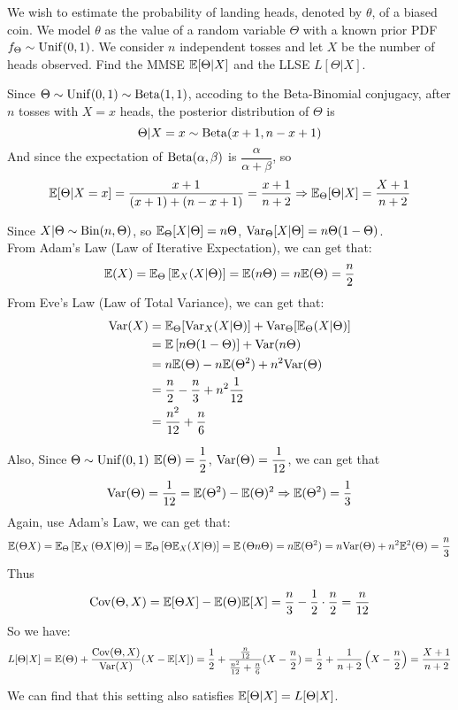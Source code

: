 \begin{homeworkProblem}

We wish to estimate the probability of landing heads, denoted by $\theta$, of a biased coin. We model $\theta$ as the value of a random variable $\Theta$ with a known prior PDF $f_{\Theta} \sim \operatorname{Unif}(0,1)$. We consider $n$ independent tosses and let $X$ be the number of heads observed. Find the MMSE $\mathbb{E}[\Theta | X]$ and the LLSE $L[\Theta | X]$.

\solution
Since $\Theta\sim\operatorname{Unif}(0,1)\sim \operatorname{Beta}(1,1)$, accoding to the Beta-Binomial conjugacy, after $n$ tosses with $X=x$ heads, the posterior distribution of $\Theta$ is
$$\Theta|X=x\sim\operatorname{Beta}(x+1, n-x+1)$$
And since the expectation of $\operatorname{Beta}(\alpha, \beta)$ is $\dfrac{\alpha}{\alpha + \beta}$, so
$$\mathbb{E}[\Theta|X=x]=\dfrac{x+1}{(x+1)+(n-x+1)}=\dfrac{x+1}{n+2} \Rightarrow \mathbb{E}_{\Theta}[\Theta|X]=\dfrac{X+1}{n+2}$$

Since $X|\Theta\sim\operatorname{Bin}(n, \Theta)$, so $\mathbb{E}_{\Theta}[X|\Theta]=n\Theta$, $\mathrm{Var}_{\Theta}[X|\Theta]=n\Theta(1-\Theta)$. \\
From Adam's Law (Law of Iterative Expectation), we can get that:
$$\mathbb{E}(X)=\mathbb{E}_{\Theta}\left[\mathbb{E}_{X}(X|\Theta)\right]=\mathbb{E}(n\Theta)=n\mathbb{E}(\Theta)=\dfrac{n}{2}$$
From Eve's Law (Law of Total Variance), we can get that:
\begin{align*}
\mathrm{Var}(X) &= \mathbb{E}_{\Theta}[\mathrm{Var}_X(X|\Theta)]+\mathrm{Var}_{\Theta}[\mathbb{E}_{\Theta}(X|\Theta)] \\
&= \mathbb{E}\left[n\Theta(1-\Theta)\right]+\mathrm{Var}(n\Theta) \\
&= n\mathbb{E}(\Theta)-n\mathbb{E}(\Theta^2)+n^2\mathrm{Var}(\Theta) \\
&= \dfrac{n}{2}-\dfrac{n}{3}+n^2\dfrac{1}{12} \\
&=\dfrac{n^2}{12}+\dfrac{n}{6}
\end{align*}

Also, Since $\Theta\sim\operatorname{Unif}(0,1)$ $\mathbb{E}(\Theta)=\dfrac{1}{2}$, $\mathrm{Var}(\Theta)=\dfrac{1}{12}$, we can get that
$$\mathrm{Var}(\Theta)=\dfrac{1}{12}=\mathbb{E}(\Theta^2)-\mathbb{E}(\Theta)^2\Rightarrow\mathbb{E}(\Theta^2)=\dfrac{1}{3}$$
Again, use Adam's Law, we can get that:
$$\mathbb{E}(\Theta X)=\mathbb{E}_{\Theta}\left[\mathbb{E}_{X}\left(\Theta X | \Theta \right)\right]=\mathbb{E}_{\Theta}\left[\Theta\mathbb{E}_{X}(X|\Theta)\right]=\mathbb{E}\left(\Theta n\Theta\right)=n\mathbb{E}(\Theta^2)=n\mathrm{Var}(\Theta)+n^2\mathbb{E}^2(\Theta)=\dfrac{n}{3}$$
Thus
$$\mathrm{Cov}(\Theta, X)=\mathbb{E}[\Theta X]-\mathbb{E}(\Theta)\mathbb{E}[X]=\dfrac{n}{3}-\dfrac{1}{2}\cdot\dfrac{n}{2}=\dfrac{n}{12}$$
So we have:
$$L[\Theta|X]=\mathbb{E}(\Theta)+\dfrac{\mathrm{Cov}(\Theta, X)}{\mathrm{Var}(X)}(X-\mathbb{E}[X])=\dfrac{1}{2}+\dfrac{\frac{n}{12}}{\frac{n^2}{12}+\frac{n}{6}}(X-\frac{n}{2})=\dfrac{1}{2}+\dfrac{1}{n+2}\left(X-\dfrac{n}{2}\right)=\dfrac{X+1}{n+2}$$





We can find that this setting also satisfies $\mathbb{E}[\Theta|X]=L[\Theta|X]$.

\end{homeworkProblem}

\newpage
